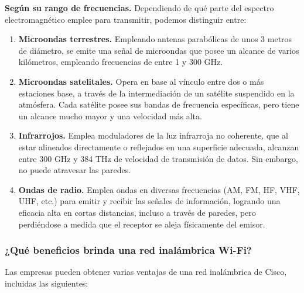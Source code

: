\documentclass[12pt]{article}
\begin{document}
  \textbf{Según su rango de frecuencias.} Dependiendo de qué parte del espectro electromagnético emplee para transmitir, podemos distinguir entre:
  \begin{enumerate} 
    \item \textbf{Microondas terrestres.} Empleando antenas parabólicas de unos 3 metros de diámetro, se emite una señal de microondas que posee un alcance de varios kilómetros, empleando frecuencias de entre 1 y 300 GHz.                                                         
    \item \textbf{Microondas satelitales.} Opera en base al vínculo entre dos o más estaciones base, a través de la intermediación de un satélite suspendido en la atmósfera. Cada satélite posee sus bandas de frecuencia específicas, pero tiene un alcance mucho mayor y una velocidad más alta.
    \item \textbf{Infrarrojos.} Emplea moduladores de la luz infrarroja no coherente, que al estar alineados directamente o reflejados en una superficie adecuada, alcanzan entre 300 GHz y 384 THz de velocidad de transmisión de datos. Sin embargo, no puede atravesar las paredes.
    \item \textbf{Ondas de radio.} Emplea ondas en diversas frecuencias (AM, FM, HF, VHF, UHF, etc.) para emitir y recibir las señales de información, logrando una eficacia alta en cortas distancias, incluso a través de paredes, pero perdiéndose a medida que el receptor se aleja físicamente del emisor.
  \end{enumerate}

  \subsubsection*{¿Qué beneficios brinda una red inalámbrica Wi-Fi?}

  Las empresas pueden obtener varias ventajas de una red inalámbrica de Cisco, incluidas las siguientes:
\end{document}

